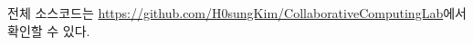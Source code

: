 \documentclass[pdflatex,sn-mathphys-num]{sn-jnl}%
\theoremstyle{thmstyleone}%
\theoremstyle{thmstyletwo}%
\theoremstyle{thmstylethree}%
\begin{document}
전체 소스코드는 \url{https://github.com/H0sungKim/CollaborativeComputingLab}에서 확인할 수 있다.



\end{document}
